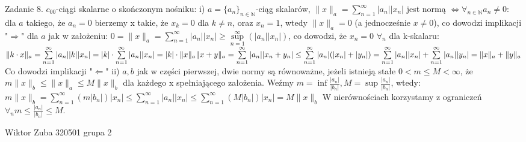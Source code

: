 \documentclass{article}
\begin{document}
Zadanie 8.
\newline
\newline
$c_{00}$-ciągi skalarne o skończonym nośniku:\newline
i) $a=\{a_n\}_{n\in\mathbb{N}}$-ciąg skalarów, $\lVert x\rVert_a=\sum\limits_{n=1}^{\infty}|a_n||x_n|$ jest normą $\Leftrightarrow\forall_{n\in\mathbb{N}}a_n\neq0$:\newline
dla $a$ takiego, że $a_n=0$ bierzemy x takie, że $x_k=0$ dla $k\neq n$, oraz $x_n=1$, wtedy $\lVert x\rVert_a=0$\newline
(a jednocześnie $x\neq0$), co dowodzi implikacji "$\Rightarrow$"\newline
dla $a$ jak w założeniu: $0=\lVert x\rVert_a=\sum\limits_{n=1}^{\infty}|a_n||x_n|\ge\sup\limits_{n=1}^{\infty}(|a_n||x_n|)$, co dowodzi, że $x_n=0$ $\forall_n$\newline
dla k-skalaru: $\lVert k\cdot x\rVert_a=\sum\limits_{n=1}^{\infty}|a_n||k||x_n|=|k|\cdot\sum\limits_{n=1}^{\infty}|a_n||x_n|=|k|\cdot\lVert x\rVert_a\newline
\lVert x+y\rVert_a=\sum\limits_{n=1}^{\infty}|a_n||x_n+y_n|\le\sum\limits_{n=1}^{\infty}|a_n|(|x_n|+|y_n|)=
\sum\limits_{n=1}^{\infty}|a_n||x_n|+\sum\limits_{n=1}^{\infty}|a_n||y_n|=\lVert x\rVert_a+\lVert y\rVert_a$\newline
Co dowodzi implikacji "$\Leftarrow$"\newline
ii) $a,b$ jak w części pierwszej, dwie normy są równoważne, jeżeli istnieją stałe $0<m\le M<\infty$,\newline
że $m\lVert x\rVert_b\le\lVert x\rVert_a\le M\lVert x\rVert_b$ dla każdego x spełniającego założenia.\newline
Weźmy $m=\inf\frac{|a_n|}{|b_n|},M=\sup\frac{|a_n|}{|b_n|}$, wtedy:\newline
$m\lVert x\rVert_b=\sum\limits_{n=1}^{\infty}(m|b_n|)|x_n|\le\sum\limits_{n=1}^{\infty}|a_n||x_n|\le\sum\limits_{n=1}^{\infty}(M|b_n|)|x_n|=M\lVert x\rVert_b$\newline
W nierównościach korzystamy z ograniczeń $\forall_n m\le \frac{|a_n|}{|b_n|}\le M$.\newpage

Wiktor Zuba 320501 grupa 2
\newline
\end{document}
